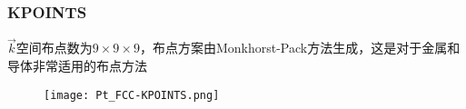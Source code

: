 \frame
{
	\frametitle{\textrm{KPOINTS}}
$\vec k$空间布点数为$9\times9\times9$，布点方案由\textrm{Monkhorst-Pack}方法生成，这是对于金属和导体非常适用的布点方法%
\begin{figure}[h!]
\centering
\texttt{[image: Pt\_FCC-KPOINTS.png]}
\caption{\fontsize{6.2pt}{5.2pt}}%
\label{Pt_FCC:KPOINTS}
\end{figure}
}
